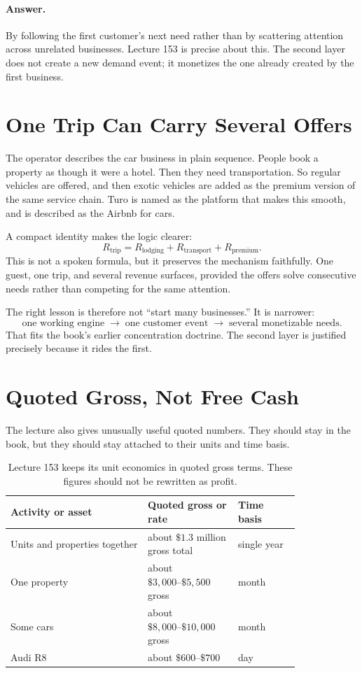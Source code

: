 \documentclass[11pt,oneside]{book}
\begin{document}
\paragraph{Answer.}
By following the first customer's next need rather than by scattering attention across unrelated businesses. Lecture 153 is precise about this. The second layer does not create a new demand event; it monetizes the one already created by the first business.

\section{One Trip Can Carry Several Offers}

The operator describes the car business in plain sequence. People book a property as though it were a hotel. Then they need transportation. So regular vehicles are offered, and then exotic vehicles are added as the premium version of the same service chain. Turo is named as the platform that makes this smooth, and is described as the Airbnb for cars.

A compact identity makes the logic clearer:
\[
R_{\mathrm{trip}}
=
R_{\mathrm{lodging}}
+
R_{\mathrm{transport}}
+
R_{\mathrm{premium}}.
\]
This is not a spoken formula, but it preserves the mechanism faithfully. One guest, one trip, and several revenue surfaces, provided the offers solve consecutive needs rather than competing for the same attention.

The right lesson is therefore not ``start many businesses.'' It is narrower:
\[
\text{one working engine}
\;\longrightarrow\;
\text{one customer event}
\;\longrightarrow\;
\text{several monetizable needs}.
\]
That fits the book's earlier concentration doctrine. The second layer is justified precisely because it rides the first.

\section{Quoted Gross, Not Free Cash}

The lecture also gives unusually useful quoted numbers. They should stay in the book, but they should stay attached to their units and time basis.

\begin{table}
\centering
\small
\begin{tabular}{p{0.40\linewidth}p{0.24\linewidth}p{0.18\linewidth}}
\hline
Activity or asset & Quoted gross or rate & Time basis \\
\hline
Units and properties together & about \(\$1.3\) million gross total & single year \\
One property & about \(\$3{,}000\text{--}\$5{,}500\) gross & month \\
Some cars & about \(\$8{,}000\text{--}\$10{,}000\) gross & month \\
Audi R8 & about \(\$600\text{--}\$700\) & day \\
\hline
\end{tabular}
\caption{Lecture 153 keeps its unit economics in quoted gross terms. These figures should not be rewritten as profit.}
\end{table}
\end{document}
